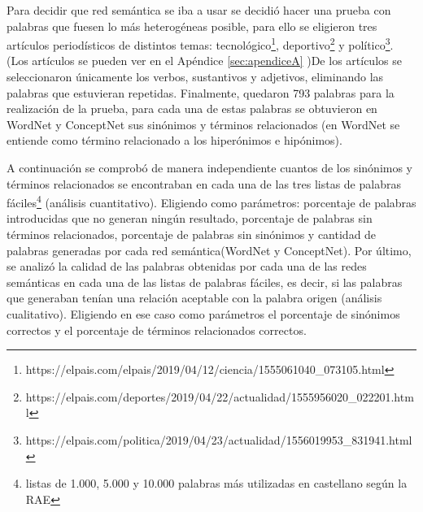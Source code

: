 Para decidir que red semántica se iba a usar se decidió hacer una prueba con palabras que fuesen lo más heterogéneas posible, para ello se eligieron tres artículos periodísticos de distintos temas: tecnológico\footnote{https://elpais.com/elpais/2019/04/12/ciencia/1555061040\_073105.html}, deportivo\footnote{https://elpais.com/deportes/2019/04/22/actualidad/1555956020\_022201.html} y político\footnote{https://elpais.com/politica/2019/04/23/actualidad/1556019953\_831941.html}. (Los artículos se pueden ver en el Apéndice \ref{sec:apendiceA} )De los artículos se seleccionaron únicamente los verbos, sustantivos y adjetivos, eliminando las palabras que estuvieran repetidas. Finalmente, quedaron 793 palabras para la realización de la prueba, para cada una de estas palabras se obtuvieron en WordNet y ConceptNet sus sinónimos y términos relacionados (en WordNet se entiende como término relacionado a los hiperónimos e hipónimos).

A continuación se comprobó de manera independiente cuantos de los sinónimos y términos relacionados se encontraban en cada una de las tres listas de palabras fáciles\footnote{listas de 1.000, 5.000 y 10.000 palabras más utilizadas en castellano según la RAE} (análisis cuantitativo). Eligiendo como parámetros: porcentaje de palabras introducidas que no generan ningún resultado, porcentaje de palabras sin términos relacionados, porcentaje de palabras sin sinónimos  y cantidad de palabras generadas por cada red semántica(WordNet y ConceptNet). Por último, se analizó la calidad de las palabras obtenidas por cada una de las redes semánticas en cada una de las listas de palabras fáciles, es decir, si las palabras que generaban tenían una relación aceptable con la palabra origen (análisis cualitativo). Eligiendo en ese caso como parámetros el porcentaje de sinónimos correctos y el porcentaje de términos relacionados correctos.

